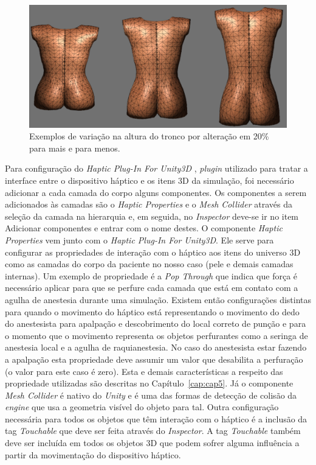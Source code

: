 \begin{figure}[ht!]
    \centering
    \includegraphics[width=0.9\linewidth]{capitulos/figuras/alteracao-modelo-altura.png} 
    \caption{Exemplos de variação na altura do tronco por alteração em 20\% para mais e para menos.}
    \label{fig:alteracaoModeloAltura}
\end{figure}

Para configuração do \textit{Haptic Plug-In For Unity3D} \cite{Poyade2014}, \textit{plugin} utilizado para tratar a interface entre o dispositivo háptico e os itens 3D da simulação, foi necessário adicionar a cada camada do corpo alguns componentes. Os componentes a serem adicionados às camadas são o \textit{Haptic Properties} e o \textit{Mesh Collider} através da seleção da camada na hierarquia e, em seguida, no \textit{Inspector} deve-se ir no item Adicionar componentes e entrar com o nome destes. O componente \textit{Haptic Properties} vem junto com o \textit{Haptic Plug-In For Unity3D}. Ele serve para configurar as propriedades de interação com o háptico aos itens do universo 3D como as camadas do corpo da paciente no nosso caso (pele e demais camadas internas). Um exemplo de propriedade é a \textit{Pop Through} que indica que força é necessário aplicar para que se perfure cada camada que está em contato com a agulha de anestesia durante uma simulação. Existem então configurações distintas para quando o movimento do háptico está representando o movimento do dedo do anestesista para apalpação e descobrimento do local correto de punção e para o momento que o movimento representa os objetos perfurantes como a seringa de anestesia local e a agulha de raquianestesia. No caso do anestesista estar fazendo a apalpação esta propriedade deve assumir um valor que desabilita a perfuração (o valor para este caso é zero). Esta e demais características a respeito das propriedade utilizadas são descritas no Capítulo~\ref{cap:cap5}. Já o componente \textit{Mesh Collider} é nativo do \textit{Unity} e é uma das formas de detecção de colisão da \textit{engine} que usa a geometria visível do objeto para tal. Outra configuração necessária para todos os objetos que têm interação com o háptico é a inclusão da tag \textit{Touchable} que deve ser feita através do \textit{Inspector}. A tag \textit{Touchable} também deve ser incluída em todos os objetos 3D que podem sofrer alguma influência a partir da movimentação do dispositivo háptico.

